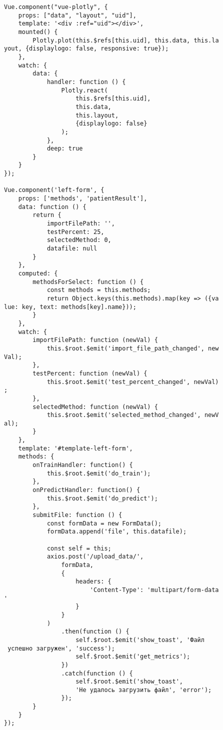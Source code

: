 \begin{verbatim}
Vue.component("vue-plotly", {
    props: ["data", "layout", "uid"],
    template: '<div :ref="uid"></div>',
    mounted() {
        Plotly.plot(this.$refs[this.uid], this.data, this.la
yout, {displaylogo: false, responsive: true});
    },
    watch: {
        data: {
            handler: function () {
                Plotly.react(
                    this.$refs[this.uid],
                    this.data,
                    this.layout,
                    {displaylogo: false}
                );
            },
            deep: true
        }
    }
});

Vue.component('left-form', {
    props: ['methods', 'patientResult'],
    data: function () {
        return {
            importFilePath: '',
            testPercent: 25,
            selectedMethod: 0,
            datafile: null
        }
    },
    computed: {
        methodsForSelect: function () {
            const methods = this.methods;
            return Object.keys(this.methods).map(key => ({va
lue: key, text: methods[key].name}));
        }
    },
    watch: {
        importFilePath: function (newVal) {
            this.$root.$emit('import_file_path_changed', new
Val);
        },
        testPercent: function (newVal) {
            this.$root.$emit('test_percent_changed', newVal)
;
        },
        selectedMethod: function (newVal) {
            this.$root.$emit('selected_method_changed', newV
al);
        }
    },
    template: '#template-left-form',
    methods: {
        onTrainHandler: function() {
            this.$root.$emit('do_train');
        },
        onPredictHandler: function() {
            this.$root.$emit('do_predict');
        },
        submitFile: function () {
            const formData = new FormData();
            formData.append('file', this.datafile);

            const self = this;
            axios.post('/upload_data/',
                formData,
                {
                    headers: {
                        'Content-Type': 'multipart/form-data
'
                    }
                }
            )
                .then(function () {
                    self.$root.$emit('show_toast', 'Файл
 успешно загружен', 'success');
                    self.$root.$emit('get_metrics');
                })
                .catch(function () {
                    self.$root.$emit('show_toast', 
                    'Не удалось загрузить файл', 'error');
                });
        }
    }
});


\end{verbatim}

